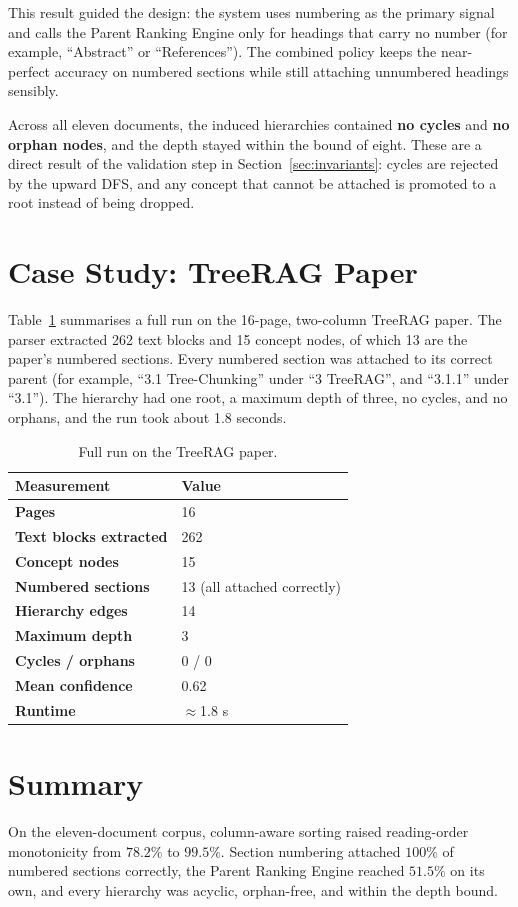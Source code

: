 \documentclass[12pt,a4paper]{report}
\begin{document}
This result guided the design: the system uses numbering as the primary signal and calls
the Parent Ranking Engine only for headings that carry no number (for example,
``Abstract'' or ``References''). The combined policy keeps the near-perfect accuracy on
numbered sections while still attaching unnumbered headings sensibly.

Across all eleven documents, the induced hierarchies contained \textbf{no cycles} and
\textbf{no orphan nodes}, and the depth stayed within the bound of eight. These are a
direct result of the validation step in Section~\ref{sec:invariants}: cycles are
rejected by the upward DFS, and any concept that cannot be attached is promoted to a
root instead of being dropped.

\section{Case Study: TreeRAG Paper}
Table~\ref{tab:case} summarises a full run on the 16-page, two-column TreeRAG paper. The
parser extracted 262 text blocks and 15 concept nodes, of which 13 are the paper's
numbered sections. Every numbered section was attached to its correct parent (for
example, ``3.1 Tree-Chunking'' under ``3 TreeRAG'', and ``3.1.1'' under ``3.1''). The
hierarchy had one root, a maximum depth of three, no cycles, and no orphans, and the run
took about 1.8 seconds.

\begin{table}[!htbp]
\centering
\caption{Full run on the TreeRAG paper.}
\label{tab:case}
\renewcommand{\arraystretch}{1.25}
{\small
\begin{tabularx}{\textwidth}{@{} >{\bfseries}l X @{}}
\toprule
Measurement & Value \\ \midrule
Pages & 16 \\
Text blocks extracted & 262 \\
Concept nodes & 15 \\
Numbered sections & 13 (all attached correctly) \\
Hierarchy edges & 14 \\
Maximum depth & 3 \\
Cycles / orphans & 0 / 0 \\
Mean confidence & 0.62 \\
Runtime & $\approx$1.8 s \\ \bottomrule
\end{tabularx}}
\end{table}

\section{Summary}
On the eleven-document corpus, column-aware sorting raised reading-order monotonicity
from $78.2\%$ to $99.5\%$. Section numbering attached $100\%$ of numbered sections
correctly, the Parent Ranking Engine reached $51.5\%$ on its own, and every hierarchy
was acyclic, orphan-free, and within the depth bound.
\end{document}

